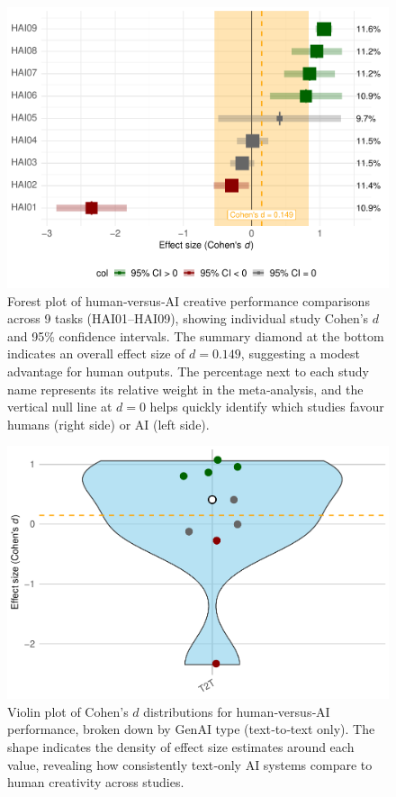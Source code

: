 \documentclass[acmsmall,authorversion]{acmart}
\begin{document}
\begin{figure}[H]
  \centering
  \includegraphics[width=\linewidth]{plot_versus_forest}
  \caption{Forest plot of human‐versus‐AI creative performance comparisons across 9 tasks (HAI01–HAI09), showing individual study Cohen’s $d$ and 95\% confidence intervals. The summary diamond at the bottom indicates an overall effect size of $d = 0.149$, suggesting a modest advantage for human outputs. The percentage next to each study name represents its relative weight in the meta‐analysis, and the vertical null line at $d=0$ helps quickly identify which studies favour humans (right side) or AI (left side).}
  \label{fig:versus_forest}
\end{figure}

\begin{figure}[H]
  \centering
  \includegraphics[width=\linewidth]{plot_versus_violin_GenAI}
  \caption{Violin plot of Cohen’s $d$ distributions for human‐versus‐AI performance, broken down by GenAI type (text‐to‐text only). The shape indicates the density of effect size estimates around each value, revealing how consistently text‐only AI systems compare to human creativity across studies.}
  \label{fig:versus_violin_GenAI}
\end{figure}
\end{document}
